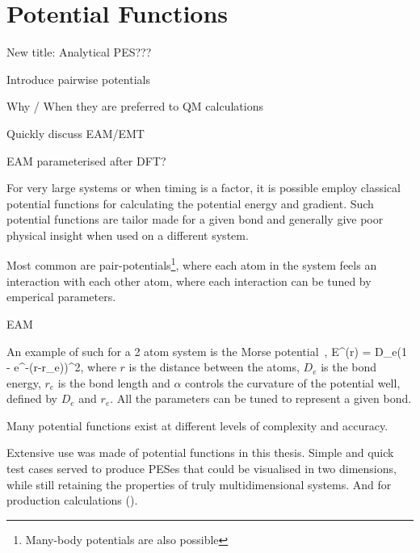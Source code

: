 \section{Potential Functions}
\label{sec:potentials}

\bit
\item New title: Analytical PES???
\item Introduce pairwise potentials
\item Why / When they are preferred to QM calculations
\item Quickly discuss EAM/EMT
\item EAM parameterised after DFT?
\eit

For very large systems or when timing is a factor, it is possible employ classical potential functions for calculating the potential energy and gradient.
Such potential functions are tailor made for a given bond and generally give poor physical insight when used on a different system.

Most common are pair-potentials\footnote{Many-body potentials are also possible}, where each atom in the system feels an interaction with each other atom, where each interaction can be tuned by emperical parameters.

EAM~\cite{eam-1983}

An example of such for a 2 atom system is the Morse potential~\cite{morse-1929},
E^(r) = D_e(1 - e^{-\alpha(r-r_e)})^2,
\eeq
where $r$ is the distance between the atoms, $D_e$ is the bond energy, $r_e$ is the bond length and $\alpha$ controls the curvature of the potential well, defined by $D_e$ and $r_e$.
All the parameters can be tuned to represent a given bond.

Many potential functions exist at different levels of complexity and accuracy.

Extensive use was made of potential functions in this thesis.
Simple and quick test cases served to produce PESes that could be visualised in two dimensions, while still retaining the properties of truly multidimensional systems.
And for production calculations ().

